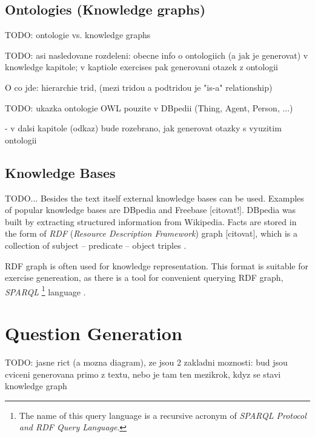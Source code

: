 \documentclass[a4paper, 12pt, twoside]{fithesis2}		%
\renewcommand{\_}{\leavevmode \kern0.0em\vbox{\hrule width0.4em}}
\begin{document}
\section{Ontologies (Knowledge graphs)}
\label{sec:ontologies}

TODO: ontologie vs. knowledge graphs

TODO: asi nasledovane rozdeleni: obecne info o ontologiich (a jak je generovat) v knowledge kapitole; v kaptiole exercises pak generovani otazek z ontologii

O co jde: hierarchie trid, (mezi tridou a podtridou je "is-a" relationship)

TODO: ukazka ontologie OWL pouzite v DBpedii (Thing, Agent, Person, ...)

- v dalsi kapitole (odkaz) bude rozebrano, jak generovat otazky s vyuzitim ontologii


\section{Knowledge Bases}
\label{sec:knowledge-bases}

TODO...
Besides the text itself external knowledge bases can be used.
Examples of popular knowledge bases are DBpedia \parencite{dbpedia} and Freebase [citovat!].
DBpedia was built by extracting structured information from Wikipedia.
Facts are stored in the form of \textit{RDF} (\textit{Resource Description Framework}) graph [citovat],
which is a collection of subject -- predicate -- object triples \parencite[][63]{semantic-web}.

RDF graph is often used for knowledge representation.
This format is suitable for exercise genereation, as there is a tool for convenient querying RDF graph,
\textit{SPARQL}%
\footnote{The name of this query language is a recursive acronym of \textit{SPARQL Protocol and RDF Query Language}.}
language \parencite[][84]{semantic-web}.



\chapter{Question Generation}
\label{chap:exercises}

TODO: jasne rict (a mozna diagram), ze jsou 2 zakladni moznosti: bud jsou cviceni generovana primo z textu, nebo je tam ten mezikrok, kdyz se stavi knowledge graph
\end{document}
